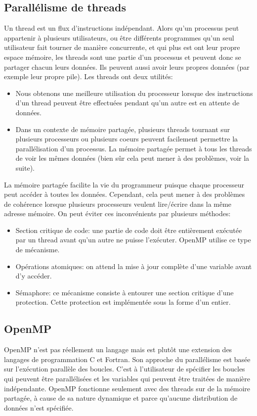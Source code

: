  
	\subsection{Parallélisme de threads}
	Un thread est un flux d'instructions indépendant. Alors qu'un processus peut appartenir à plusieurs utilisateurs, ou être différents programmes qu'un seul utilisateur fait tourner de manière concurrente, et qui plus est ont leur propre espace mémoire, les threads sont une partie d'un processus et peuvent donc se partager chacun leurs données. Ils peuvent aussi avoir leurs propres données (par exemple leur propre pile). Les threads ont deux utilités:
	\begin{itemize}
	\item Nous obtenons une meilleure utilisation du processeur lorsque des instructions d'un thread peuvent être effectuées pendant qu'un autre est en attente de données.
	\item Dans un contexte de mémoire partagée, plusieurs threads tournant sur plusieurs processeurs ou plusieurs coeurs peuvent facilement permettre la parallélisation d'un processus. La mémoire partagée permet à tous les threads de voir les mêmes données (bien sûr cela peut mener à des problèmes, voir la suite).
	\end{itemize}
	
	La mémoire partagée facilite la vie du programmeur puisque chaque processeur peut accéder à toutes les données. Cependant, cela peut mener à des problèmes de cohérence lorsque plusieurs processeurs veulent lire/écrire dans la même adresse mémoire. On peut éviter ces inconvénients par plusieurs méthodes:
	\begin{itemize}
	\item Section critique de code: une partie de code doit être entièrement exécutée par un thread avant qu'un autre ne puisse l'exécuter. OpenMP utilise ce type de mécanisme.
	\item Opérations atomiques: on attend la mise à jour complète d'une variable avant d'y accéder. 
	\item Sémaphore: ce mécanisme consiste à entourer une section critique d'une protection. Cette protection est implémentée sous la forme d'un entier.
	\end{itemize}
	
	\subsection{OpenMP}
	OpenMP n'est pas réellement un langage mais est plutôt une extension des langages de programmation C et Fortran. Son approche du parallélisme est basée sur l'exécution parallèle des boucles. C'est à l'utilisateur de spécifier les boucles qui peuvent être parallélisées et les variables qui peuvent être traitées de manière indépendante. OpenMP fonctionne seulement avec des threads sur de la mémoire partagée, à cause de sa nature dynamique et parce qu'aucune distribution de données n'est spécifiée. 
	
